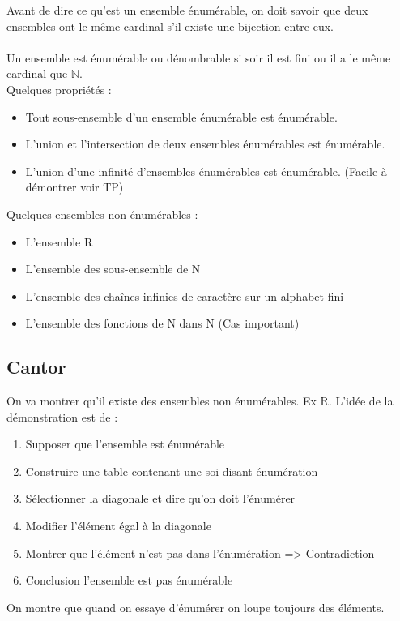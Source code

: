 \documentclass[11pt,a4paper]{article}
\begin{document}
Avant de dire ce qu'est un ensemble énumérable, on doit savoir que deux ensembles
ont le même cardinal s’il existe une bijection entre eux.

\paragraph{}
Un ensemble est énumérable ou dénombrable si soir il est fini ou il a le même cardinal que $\mathbb{N}$. \\
Quelques propriétés : 
\begin{itemize}
	\item Tout sous-ensemble d'un ensemble énumérable est énumérable.
	\item L'union et l'intersection de deux ensembles énumérables est énumérable.
	\item L'union d'une infinité d'ensembles énumérables est énumérable. (Facile à
		démontrer voir TP)
\end{itemize}

Quelques ensembles non énumérables : 
\begin{itemize}
	\item L'ensemble R
	\item L'ensemble des sous-ensemble de N
	\item L'ensemble des chaînes infinies de caractère sur un alphabet fini
	\item L'ensemble des fonctions de N dans N (Cas important)
\end{itemize}

\subsection{Cantor}
\label{sub:cantor}
On va montrer qu'il existe des ensembles non énumérables. Ex R.
L'idée de la démonstration est de :
\begin{enumerate}
	\item Supposer que l'ensemble est énumérable
 	\item Construire une table contenant une soi-disant énumération
	\item Sélectionner la diagonale et dire qu'on doit l'énumérer
	\item Modifier l'élément égal à la diagonale
	\item Montrer que l'élément n'est pas dans l'énumération => Contradiction
	\item Conclusion l'ensemble est pas énumérable
\end{enumerate}
On montre que quand on essaye d'énumérer on loupe toujours des éléments.
\end{document}
